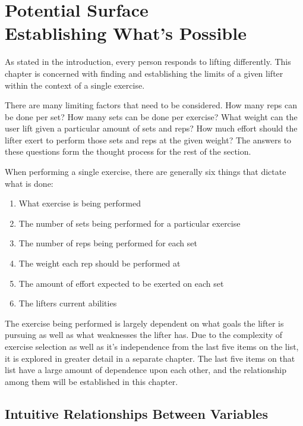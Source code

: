 \chapter{
    Potential Surface
    \\
    \large{Establishing What's Possible}
}
\label{sec:PotentialSurface}

As stated in the introduction, every person responds to lifting differently. This chapter is concerned with finding and establishing the limits of a given lifter within the context of a single exercise.

There are many limiting factors that need to be considered. How many reps can be done per set? How many sets can be done per exercise? What weight can the user lift given a particular amount of sets and reps? How much effort should the lifter exert to perform those sets and reps at the given weight? The answers to these questions form the thought process for the rest of the section.

When performing a single exercise, there are generally six things that dictate what is done:
\begin{enumerate}
    \item What exercise is being performed
    \item The number of sets being performed for a particular exercise
    \item The number of reps being performed for each set
    \item The weight each rep should be performed at
    \item The amount of effort expected to be exerted on each set
    \item The lifters current abilities
\end{enumerate}

The exercise being performed is largely dependent on what goals the lifter is pursuing as well as what weaknesses the lifter has. Due to the complexity of exercise selection as well as it's independence from the last five items on the list, it is explored in greater detail in a separate chapter. The last five items on that list have a large amount of dependence upon each other, and the relationship among them will be established in this chapter.

\section{Intuitive Relationships Between Variables}
\label{sec:PotentialSurfaceIntuitiveRelationshipsBetweenVariables}

